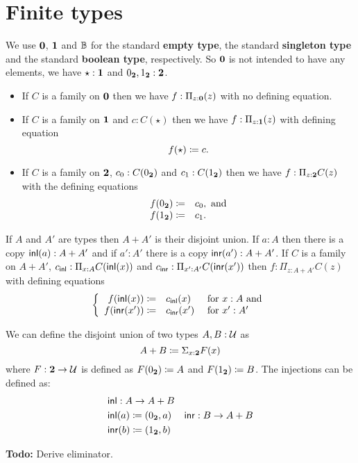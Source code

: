 \section{Finite types}
\label{sec:finite-types}

We use $\mathbf{0}$, $\mathbf{1}$ and $\mathbb{B}$ for the standard {\bf empty
  type}, the standard {\bf singleton type} and the standard {\bf
  boolean type}, respectively.  So $\mathbf{0}$ is not intended to have
any elements, we have $\star:\mathbf{1}$ and $0_\mathbf{2},1_\mathbf{2}:\mathbf{2}$.
\begin{itemize}
\item If $C$ is a family on $\mathbf{0}$ then we have $f:\Pi_{z:\mathbf{0}}(z)$ with no defining equation.
\item If $C$ is a family on $\mathbf{1}$ and $c:C(\star)$ then we have $f:\Pi_{z:\mathbf{1}}(z)$ with defining equation
  \[ f(\star)\coloneqq c.\]
\item If $C$ is a family on $\mathbf{2}$, $c_0:C(0_\mathbf{2})$ 
and $c_1:C(1_\mathbf{2})$ then we have $f:\Pi_{z:\mathbf{2}}C(z)$ with the defining equations
 \[ \begin{array}{rl}
f(0_\mathbf{2}) \coloneqq& c_0, \mbox{ and}\\
f(1_\mathbf{2}) \coloneqq& c_1.
  \end{array}\]
\end{itemize}

If $A$ and $A'$ are types then $A+A'$ is their disjoint union.  If
$a:A$ then there is a copy $\mathsf{inl}(a):A+A'$ and if $a':A'$ there is a
copy $\mathsf{inr}(a'):A+A'$.
If $C$ is a family on $A+A'$, $c_\mathsf{inl}:\Pi_{x:A}C(\mathsf{inl}(x))$ and $c_\mathsf{inr}:\Pi_{x':A'}C(\mathsf{inr}(x'))$ then $f:\Pi_{z:A+A'}C(z)$ with defining equations
  \[\left\{\begin{array}{rll} 
f(\mathsf{inl}(x))\coloneqq& c_\mathsf{inl}(x)&\mbox{ for } x:A \mbox{ and}\\
f(\mathsf{inr}(x'))\coloneqq& c_\mathsf{inr}(x')&\mbox{ for } x':A'\\
\end{array}\right.\]

We can define the disjoint union of two types $A,B:\mathcal{U}$ as
\[A + B \coloneqq \Sigma_{x:\mathbf{2}}F(x)\]
where $F : \mathbf{2} \to \mathcal{U}$ is
defined as $F(0_\mathbf{2}) \coloneqq A$ and $F(1_\mathbf{2})\coloneqq B$. The
injections can be defined as:
\begin{align*}
& \mathsf{inl} :  A \to A+B\\
& \mathsf{inl}(a) \coloneqq (0_\mathbf{2},a)
& \mathsf{inr} :  B \to A+B\\
& \mathsf{inr}(b) \coloneqq (1_\mathbf{2},b)
\end{align*}

\textbf{Todo:} Derive eliminator.

